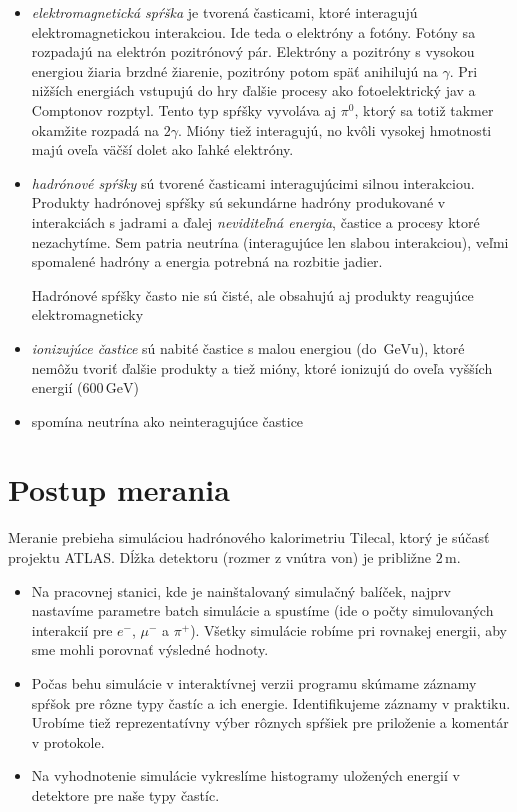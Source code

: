 \documentclass[a4paper, 10pt]{article}
\newcommand{\unit}[1]{\ensuremath{\, \mathrm{#1}}}
\begin{document}
\begin{itemize}
\item \textit{elektromagnetická spŕška} je tvorená časticami, ktoré interagujú elektromagnetickou interakciou. Ide teda o elektróny a fotóny. Fotóny sa rozpadajú na elektrón pozitrónový pár. Elektróny a pozitróny s vysokou energiou žiaria brzdné žiarenie, pozitróny potom späť anihilujú na $\gamma$. Pri nižších energiách vstupujú do hry ďalšie procesy ako fotoelektrický jav a Comptonov rozptyl. Tento typ spŕšky vyvoláva aj $\pi^0$, ktorý sa totiž takmer okamžite rozpadá na $2\gamma$. Mióny tiež interagujú, no kvôli vysokej hmotnosti majú oveľa väčší dolet ako ľahké elektróny.

\item \textit{hadrónové spŕšky} sú tvorené časticami interagujúcimi silnou interakciou. Produkty hadrónovej spŕšky sú sekundárne hadróny produkované v interakciách s jadrami a ďalej \textit{neviditeľná energia}, častice a procesy ktoré nezachytíme. Sem patria neutrína (interagujúce len slabou interakciou), veľmi spomalené hadróny a energia potrebná na rozbitie jadier.

Hadrónové spŕšky často nie sú čisté, ale obsahujú aj produkty reagujúce elektromagneticky

\item \textit{ionizujúce častice} sú nabité častice s malou energiou (do $\unit{GeV}$u), ktoré nemôžu tvoriť ďalšie produkty a tiež mióny, ktoré ionizujú do oveľa vyšších energií ($600\unit{GeV}$)

\item \cite{stud} spomína neutrína ako neinteragujúce častice
\end{itemize}

\section*{Postup merania}
Meranie prebieha simuláciou hadrónového kalorimetriu Tilecal, ktorý je súčasť projektu \mbox{ATLAS}. Dĺžka detektoru (rozmer z vnútra von) je približne $2\unit{m}$.

\begin{itemize}
\item Na pracovnej stanici, kde je nainštalovaný simulačný balíček, najprv nastavíme parametre batch simulácie a spustíme (ide o počty simulovaných interakcií pre $e^-$, $\mu^-$ a $\pi^+$). Všetky simulácie robíme pri rovnakej energii, aby sme mohli porovnať výsledné hodnoty.
\item Počas behu simulácie v interaktívnej verzii programu skúmame záznamy spŕšok pre rôzne typy častíc a ich energie. Identifikujeme záznamy v praktiku. Urobíme tiež reprezentatívny výber rôznych spŕšiek pre priloženie a komentár v protokole.
\item Na vyhodnotenie simulácie vykreslíme histogramy uložených energií v detektore pre naše typy častíc.
\end{itemize}
\end{document}
